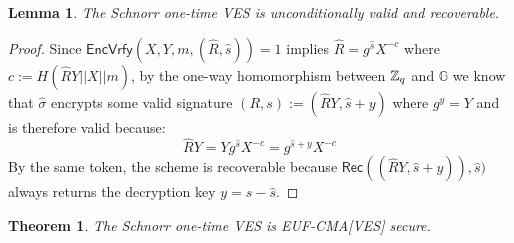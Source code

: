 \documentclass[fullpage]{article}
\newtheorem{lemma}{Lemma}[section]
\newtheorem{theorem}{Theorem}[section]
\theoremstyle{definition}
\newcommand{\EUFCMAVES}{\textsf{EUF-CMA}[\textsf{VES}]\xspace}
\newcommand{\EncVer}{\textsf{EncVrfy}}
\newcommand{\Rec}{\textsf{Rec}}
\newcommand{\hatsigma}{\hat{\sigma}}
\newcommand{\G}{\mathbb{G}}
\begin{document}
\begin{lemma}
The Schnorr one-time VES is unconditionally valid and recoverable.
\end{lemma}

\begin{proof}
 Since $\EncVer(X,Y,m,(\hat{R},\hat{s})) = 1$ implies $ \hat{R} = g^{\hat{s}}X^{-c}$ where $c := H(\hat{R}Y || X || m)$, by the one-way homomorphism between $\mathbb{Z}_q$ and $\G$ we know that $\hatsigma$ encrypts some valid signature $(R,s) := (\hat{R}Y, \hat{s} + y)$ where $g^y = Y$ and is therefore valid because:
\[ \hat{R}Y = Yg^{\hat{s}}X^{-c} = g^{\hat{s} + y}X^{-c} \]
By the same token, the scheme is recoverable because $\Rec((\hat{R}Y, \hat{s} + y)), \hat{s})$ always returns the decryption key $y = s - \hat{s}$.
\end{proof}


\begin{theorem}
The Schnorr one-time VES is \EUFCMAVES secure.
\end{theorem}
\end{document}
